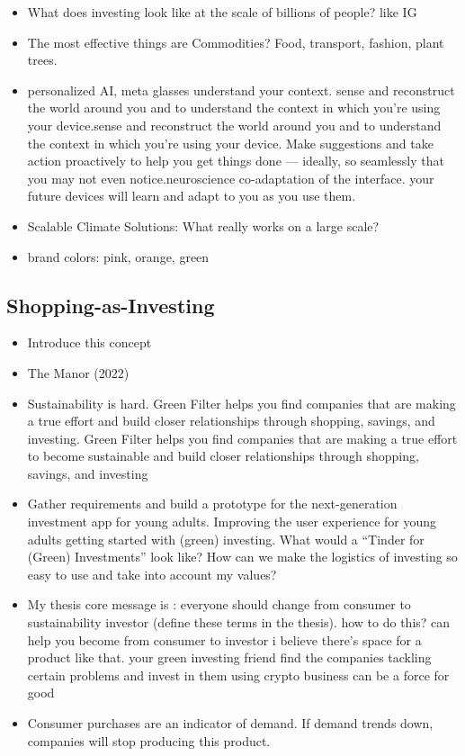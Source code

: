\documentclass[
  letterpaper,
  DIV=11,
  numbers=noendperiod]{scrartcl}
\providecommand{\tightlist}{%
  \setlength{\itemsep}{0pt}\setlength{\parskip}{0pt}}\usepackage{longtable,booktabs,array}
\begin{document}
\begin{itemize}
\tightlist
\item
  What does investing look like at the scale of billions of people? like
  IG
\item
  The most effective things are Commodities? Food, transport, fashion,
  plant trees.
\item
  personalized AI, meta glasses understand your context. sense and
  reconstruct the world around you and to understand the context in
  which you're using your device.sense and reconstruct the world around
  you and to understand the context in which you're using your device.
  Make suggestions and take action proactively to help you get things
  done --- ideally, so seamlessly that you may not even
  notice.neuroscience co-adaptation of the interface. your future
  devices will learn and adapt to you as you use them.
\item
  Scalable Climate Solutions: What really works on a large scale?
\item
  brand colors: pink, orange, green
\end{itemize}

\subsection{Shopping-as-Investing}\label{shopping-as-investing}

\begin{itemize}
\item
  Introduce this concept
\item
  The Manor (2022)
\item
  Sustainability is hard. Green Filter helps you find companies that are
  making a true effort and build closer relationships through shopping,
  savings, and investing. Green Filter helps you find companies that are
  making a true effort to become sustainable and build closer
  relationships through shopping, savings, and investing
\item
  Gather requirements and build a prototype for the next-generation
  investment app for young adults. Improving the user experience for
  young adults getting started with (green) investing. What would a
  ``Tinder for (Green) Investments'' look like? How can we make the
  logistics of investing so easy to use and take into account my values?
\item
  My thesis core message is : everyone should change from consumer to
  sustainability investor (define these terms in the thesis). how to do
  this? can help you become from consumer to investor i believe there's
  space for a product like that. your green investing friend find the
  companies tackling certain problems and invest in them using crypto
  business can be a force for good
\item
  Consumer purchases are an indicator of demand. If demand trends down,
  companies will stop producing this product.
\end{itemize}
\end{document}
